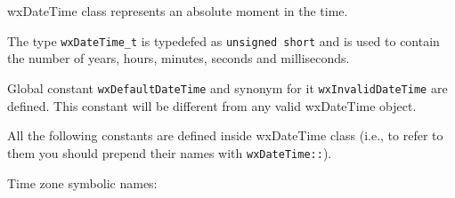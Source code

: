 
\section{}\label{wxdatetime}

wxDateTime class represents an absolute moment in the time.


The type {\tt wxDateTime\_t} is typedefed as {\tt unsigned short} and is used
to contain the number of years, hours, minutes, seconds and milliseconds.


Global constant {\tt wxDefaultDateTime} and synonym for it {\tt wxInvalidDateTime} are defined. This constant will be different from any valid
wxDateTime object.

All the following constants are defined inside wxDateTime class (i.e., to refer to
them you should prepend their names with {\tt wxDateTime::}).

\label{wxdatetimetimezones}
Time zone symbolic names:

